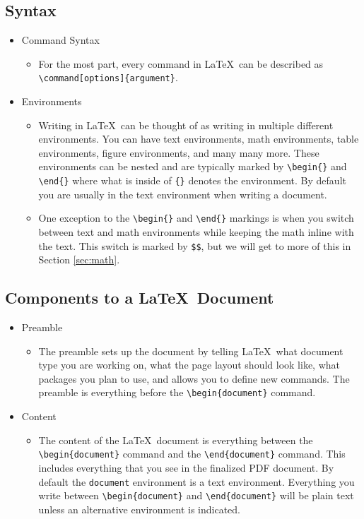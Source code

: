 \documentclass[]{article}%
\newcommand{\bs}{\textbackslash}
\newcommand{\TT}[1]{\texttt{#1}}
\newcommand{\tpc}{\textperiodcentered}
\theoremstyle{definition}
\begin{document}
\subsection{Syntax}
\begin{itemize}
	\item Command Syntax
	\begin{itemize}
		\item For the most part, every command in \LaTeX\ can be described as \TT{\bs command[options]\{argument\}}.
	\end{itemize}
	\item Environments
	\begin{itemize}
		\item Writing in \LaTeX\ can be thought of as writing in multiple different environments.
		You can have text environments, math environments, table environments, figure environments, and many many more.
		These environments can be nested and are typically marked by \TT{\bs begin\{\tpc\}} and \TT{\bs end\{\tpc\}} where what is inside of \TT{\{\tpc\}} denotes the environment.
		By default you are usually in the text environment when writing a document.
		\item One exception to the \TT{\bs begin\{\tpc\}} and \TT{\bs end\{\tpc\}} markings is when you switch between text and math environments while keeping the math inline with the text.
		This switch is marked by \TT{\$\tpc\$}, but we will get to more of this in Section \ref{sec:math}.
	\end{itemize}
\end{itemize}

\subsection{Components to a \LaTeX\ Document}
\begin{itemize}
 \item Preamble
 	\begin{itemize}
 	\item The preamble sets up the document by telling \LaTeX\ what document type you are working on, what the page layout should look like, what packages you plan to use, and allows you to define new commands.
 	The preamble is everything before the \TT{\bs begin\{document\}} command.
 	\end{itemize}
 \item Content
 	\begin{itemize}
 	\item The content of the \LaTeX\ document is everything between the \TT{\bs begin\{document\}} command and the \TT{\bs end\{document\}} command.
 	This includes everything that you see in the finalized PDF document.
 	By default the \TT{document} environment is a text environment.
 	Everything you write between \TT{\bs begin\{document\}} and \TT{\bs end\{document\}} will be plain text unless an alternative environment is indicated.
 	\end{itemize}
\end{itemize}
\end{document}
